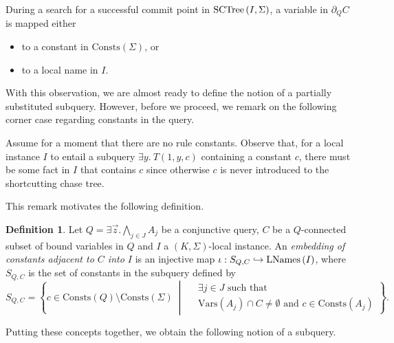 \documentclass[12pt]{report}
\theoremstyle{plain}
\theoremstyle{definition}
\newtheorem{definition}[theorem]{Definition}
\def\Vars{{\mathrm{Vars}}}
\def\Consts{{\mathrm{Consts}}}
\newcommand{\SCTree}[2]{\ensuremath{\normalfont{\textrm{SCTree}} \left( #1, #2 \right)}}
\newcommand{\LNames}[1]{\ensuremath{\normalfont{\textrm{LNames}} \left( #1 \right)}}
\begin{document}
During a search for a successful commit point in $\SCTree{I}{\Sigma}$, a variable in $\partial_Q C$ is mapped either
\begin{itemize}
  \item to a constant in $\Consts(\Sigma)$, or
  \item to a local name in $I$.
\end{itemize}

With this observation, we are almost ready to define the notion of a partially substituted subquery. However, before we proceed, we remark on the following corner case regarding constants in the query.

Assume for a moment that there are no rule constants. Observe that, for a local instance $I$ to entail a subquery $\exists y.\ T(1, y, c)$ containing a constant $c$, there must be some fact in $I$ that contains $c$ since otherwise $c$ is never introduced to the shortcutting chase tree.

This remark motivates the following definition.

\begin{definition}
  Let $Q = \exists \vec{z}. \bigwedge_{j \in J} A_j$ be a conjunctive query, $C$ be a $Q$-connected subset of bound variables in $Q$ and $I$ a $(K, \Sigma)$-local instance. An \emph{embedding of constants adjacent to $C$ into $I$} is an injective map $\iota: S_{Q, C} \hookrightarrow \LNames{I}$, where $S_{Q, C}$ is the set of constants in the subquery defined by $$
  S_{Q, C} = \left\{
      c \in \Consts(Q) \setminus \Consts(\Sigma)
        \;\middle|\;
      \begin{aligned}
        & \exists j \in J \text{ such that } \\
        & \Vars(A_j) \cap C \neq \emptyset \text{ and } c \in \Consts(A_j)
      \end{aligned}
    \right\}.
  $$
\end{definition}

Putting these concepts together, we obtain the following notion of a subquery.
\end{document}
